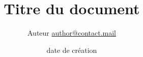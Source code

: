 \documentclass[12pt,a4paper]{report}
\begin{document}
  \title{Titre du document}
  \author{Auteur  \href{mailto:author@contact.mail}{author@contact.mail}}
  \date{date de création}
  
  \maketitle

  \renewcommand{\contentsname}{Sommaire}
  \tableofcontents
  
\end{document}
